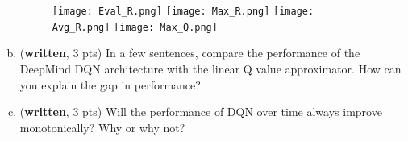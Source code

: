 \documentclass{article}
\newif\ifanswers
\newcommand{\ifans}[1]{\ifanswers \color{red} \textbf{Solution: } #1 \color{black} \else {} \fi}
\begin{document}
\begin{enumerate}[(a)]
\begin{figure}[H]
\centering
  \texttt{[image: Eval\_R.png]}
  \texttt{[image: Max\_R.png]}
  \texttt{[image: Avg\_R.png]}
  \texttt{[image: Max\_Q.png]}
\end{figure}

\item (\textbf{written}, 3 pts) In a few sentences, compare the performance of the DeepMind DQN architecture with the linear Q value approximator. How can you explain the gap in performance?

\ifans{
}

\item (\textbf{written}, 3 pts) Will the performance of DQN over time always improve monotonically? Why or why not? 

\ifans{
}

\end{enumerate}

\printbibliography
\end{document}
